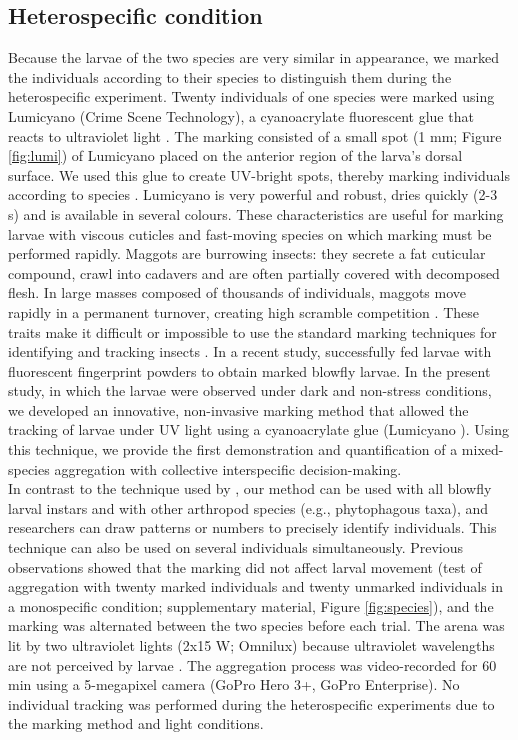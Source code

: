		\subsection{Heterospecific condition}
Because the larvae of the two species are very similar in appearance, we marked the individuals according to their species to distinguish them during the heterospecific experiment. Twenty individuals of one species were marked using Lumicyano (Crime Scene Technology), a cyanoacrylate fluorescent glue that reacts to ultraviolet light \cite{prete_lumicyano:_2013}. The marking consisted of a small spot (1 mm; Figure \ref{fig:lumi}) of Lumicyano placed on the anterior region of the larva’s dorsal surface. We used this glue to create UV-bright spots, thereby marking individuals according to species \cite{prete_lumicyano:_2013}. Lumicyano is very powerful and robust, dries quickly (2-3 s) and is available in several colours. These characteristics are useful for marking larvae with viscous cuticles and fast-moving species on which marking must be performed rapidly. Maggots are burrowing insects: they secrete a fat cuticular compound, crawl into cadavers and are often partially covered with decomposed flesh. In large masses composed of thousands of individuals, maggots move rapidly in a permanent turnover, creating high scramble competition \cite{rivers_physiological_2011}. These traits make it difficult or impossible to use the standard marking techniques for identifying and tracking insects \cite{hagler_methods_2001}. In a recent study, \citet{rosati_investigating_2015} successfully fed larvae with fluorescent fingerprint powders to obtain marked blowfly larvae. In the present study, in which the larvae were observed under dark and non-stress conditions, we developed an innovative, non-invasive marking method that allowed the tracking of larvae under UV light using a cyanoacrylate glue (Lumicyano \cite{prete_lumicyano:_2013}). Using this technique, we provide the first demonstration and quantification of a mixed-species aggregation with collective interspecific decision-making.\\
In contrast to the technique used by \citet{rosati_investigating_2015}, our method can be used with all blowfly larval instars and with other arthropod species (e.g., phytophagous taxa), and researchers can draw patterns or numbers to precisely identify individuals. This technique can also be used on several individuals simultaneously. Previous observations showed that the marking did not affect larval movement (test of aggregation with twenty marked individuals and twenty unmarked individuals in a monospecific condition; supplementary material, Figure \ref{fig:species}), and the marking was alternated between the two species before each trial. The arena was lit by two ultraviolet lights (2x15 W; Omnilux) because ultraviolet wavelengths are not perceived by larvae \cite{hinnemann_see_2010}. The aggregation process was video-recorded for 60 min using a 5-megapixel camera (GoPro Hero 3+, GoPro Enterprise). No individual tracking was performed during the heterospecific experiments due to the marking method and light conditions.

